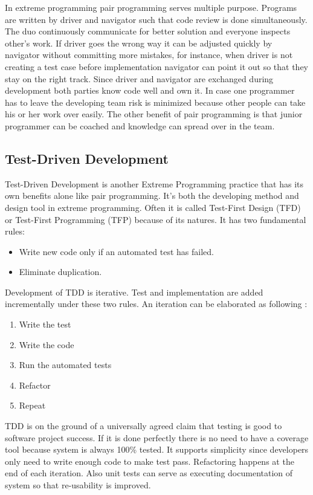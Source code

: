 In extreme programming pair programming serves multiple purpose. Programs
are written by driver and navigator such that code review is done
simultaneously. The duo continuously communicate for better solution and
everyone inspects other's work. If driver goes the wrong way it can be
adjusted quickly by navigator without committing more mistakes, for
instance, when driver is not creating a test case before implementation
navigator can point it out so that they stay on the right track. Since
driver and navigator are exchanged during development both parties know
code well and own it. In case one programmer has to leave the developing
team risk is minimized because other people can take his or her work
over easily. The other benefit of pair programming is that junior
programmer can be coached and knowledge can spread over in the
team.\cite{PPWiki}

\subsection{Test-Driven Development}
Test-Driven Development is another Extreme Programming practice that has
its own benefits alone like pair programming. It's both the developing
method and design tool in extreme programming. Often it is called
Test-First Design (TFD) or Test-First Programming (TFP) because of its
natures. It has two fundamental rules:
\begin{itemize}
\item Write new code only if an automated test has failed.
\item Eliminate duplication.
\end{itemize}

Development of TDD is iterative. Test and implementation are added
incrementally under these two rules. An iteration can be elaborated as
following \cite{TDDWiki}:

\begin{enumerate}
\item Write the test
\item Write the code
\item Run the automated tests
\item Refactor
\item Repeat
\end{enumerate}

TDD is on the ground of a universally agreed claim that testing is good
to software project success. If it is done perfectly there is no need to
have a coverage tool because system is always 100\% tested. It supports
simplicity since developers only need to write enough code to make test
pass. Refactoring happens at the end of each iteration. Also unit tests can
serve as executing documentation of system so that re-usability is
improved.

